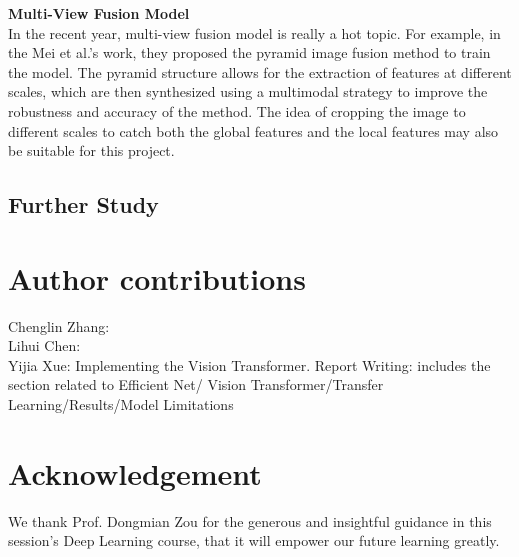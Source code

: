 \documentclass{article}
\begin{document}
\textbf{Multi-View Fusion Model}\\
In the recent year, multi-view fusion model is really a hot topic. For example, in the Mei et al.\cite{mei2018unsupervised}'s work, they proposed the pyramid image fusion method to train the model.  The pyramid structure allows for the extraction of features at different scales, which are then synthesized using a multimodal strategy to improve the robustness and accuracy of the method. The idea of cropping the image to different scales to catch both the global features and the local features may also be suitable for this project.


\subsection{Further Study}


\section{Author contributions}
Chenglin Zhang: \\
Lihui Chen: \\
Yijia Xue: Implementing the Vision Transformer. Report Writing: includes the section related to Efficient Net/ Vision Transformer/Transfer Learning/Results/Model Limitations\\
\section{Acknowledgement}
We thank Prof. Dongmian Zou for the generous and insightful guidance in this session's Deep Learning course, that it will empower our future learning greatly.

\clearpage
    
\clearpage

  
  
\end{document}
